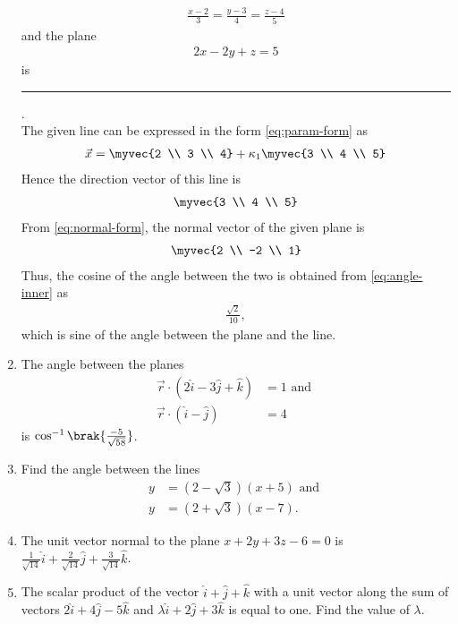 \begin{enumerate}[label=\thesubsection.\arabic*, ref=\thesubsection.\theenumi]
\begin{align}
	\frac{x-2}{3}=\frac{y-3}{4}=\frac{z-4}{5} 
\end{align}
and the plane  
\begin{align}
2x-2y+z=5
\end{align}
is \rule{1cm}{0.1pt}.
\\
\solution The given line can be expressed in the form 
	\eqref{eq:param-form}
	as
\begin{align}
	\vec{x} = \myvec{2 \\ 3 \\ 4} + \kappa_1 \myvec{3 \\ 4 \\ 5}
\end{align}
Hence the direction vector of this line is 
\begin{align}
\myvec{3 \\ 4 \\ 5}
\end{align}
	From \eqref{eq:normal-form},  the normal vector of the given plane is 
\begin{align}
\myvec{2 \\ -2 \\ 1}
\end{align}
Thus,  the cosine of the angle between the two is 
obtained from \eqref{eq:angle-inner} as
\begin{align}
	\frac{\sqrt{2}}{10}, 
\end{align}
which is sine of the angle between the plane and the line.
\item The angle between the planes 
\begin{align}
	\overrightarrow{r} \cdot (2\hat{i}-3\hat{j}+\hat{k})&=1 
	\text{ and }
	\\
	\overrightarrow{r} \cdot (\hat{i}-\hat{j})&=4  
\end{align}
is
	$\cos^{-1} \brak{\frac{-5}{\sqrt{58}}}$.
\item Find the angle between the lines 
\begin{align}
	y&=(2-\sqrt{3})(x+5)\text{ and }
	\\
	y&=(2+\sqrt{3})(x-7).
\end{align}
\item The unit vector normal to the plane $x+2y+3z-6=0$ is $\frac{1}{\sqrt{14}}\hat{i} + \frac{2}{\sqrt{14}}\hat{j} + \frac{3}{\sqrt{14}}\hat{k}$.
\item The scalar product of the vector $\hat{i}+\hat{j}+\hat{k}$ with a unit vector along the sum of vectors $2\hat{i}+4\hat{j}-5\hat{k}$ and $\lambda\hat{i}+2\hat{j}+3\hat{k}$ is equal to one. Find the value of $\lambda$.

\end{enumerate}
